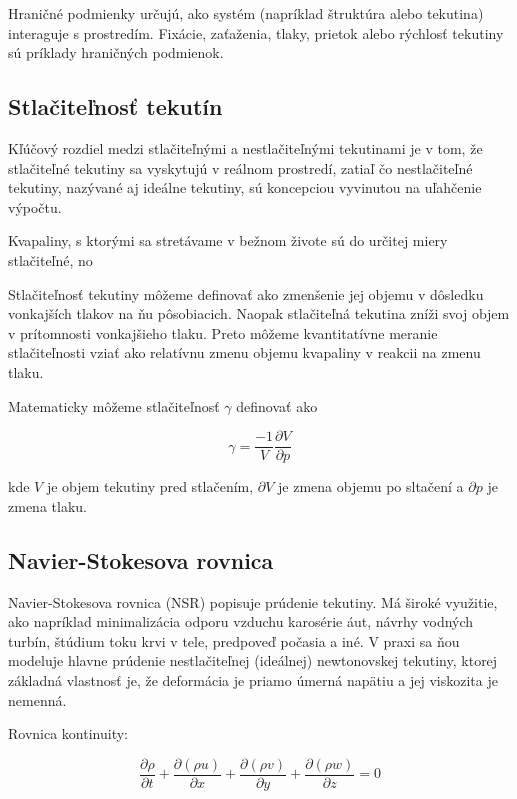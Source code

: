 \documentclass[]{tukediphc}
\begin{document}
Hraničné podmienky určujú, ako systém (napríklad štruktúra alebo tekutina) interaguje s prostredím. Fixácie, zaťaženia, tlaky, prietok alebo rýchlosť tekutiny sú príklady hraničných podmienok.

\subsection{Stlačiteľnosť tekutín}

Kľúčový rozdiel medzi stlačiteľnými a nestlačiteľnými tekutinami je v tom, že stlačiteľné tekutiny sa vyskytujú v reálnom prostredí, zatiaľ čo nestlačiteľné tekutiny, nazývané aj ideálne tekutiny, sú koncepciou vyvinutou na uľahčenie výpočtu.

Kvapaliny, s ktorými sa stretávame v bežnom živote sú do určitej miery stlačiteľné, no 


Stlačiteľnosť tekutiny môžeme definovať ako zmenšenie jej objemu v dôsledku vonkajších tlakov na ňu pôsobiacich. Naopak stlačiteľná tekutina zníži svoj objem v prítomnosti vonkajšieho tlaku. Preto môžeme kvantitatívne meranie stlačiteľnosti vziať ako relatívnu zmenu objemu kvapaliny v reakcii na zmenu tlaku.

Matematicky môžeme stlačiteľnosť $\gamma$ definovať ako

\begin{equation}
	\gamma = \frac{-1}{V} \frac{\partial V}{\partial p}
\end{equation}

kde $V$ je objem tekutiny pred stlačením, $\partial V$ je zmena objemu po sltačení a $\partial p$ je zmena tlaku.

\subsection{Navier-Stokesova rovnica}

Navier-Stokesova rovnica (NSR) popisuje prúdenie tekutiny. Má široké využitie, ako napríklad minimalizácia odporu vzduchu karosérie áut, návrhy vodných turbín, štúdium toku krvi v tele, predpoveď počasia a iné. V praxi sa ňou modeluje hlavne prúdenie nestlačiteľnej (ideálnej) newtonovskej tekutiny, ktorej základná vlastnosť je, že deformácia je priamo úmerná napätiu a jej viskozita je nemenná.

Rovnica kontinuity:

\begin{equation}
\frac{\partial \rho}{\partial t} + \frac{\partial (\rho u)}{\partial x} + \frac{\partial (\rho v)}{\partial y} + \frac{\partial (\rho w)}{\partial z} = 0
\end{equation}
\end{document}
